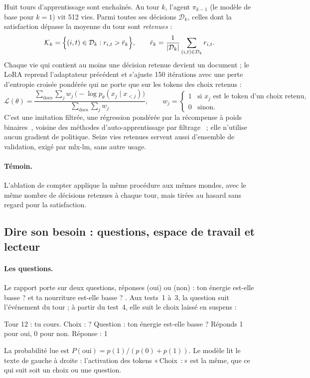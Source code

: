 \documentclass[11pt,a4paper]{article}
\newcommand{\Choix}{«\,Choix~:\,»}
\begin{document}
Huit tours d'apprentissage sont enchaînés. Au tour $k$, l'agent $\pi_{k-1}$ (le
modèle de base pour $k=1$) vit 512 vies. Parmi toutes ses décisions $\mathcal D_k$,
celles dont la satisfaction dépasse la moyenne du tour sont \emph{retenues} :
\begin{equation}
\mathcal K_k=\Bigl\{(i,t)\in\mathcal D_k : r_{i,t} > \bar r_k\Bigr\},\qquad
\bar r_k=\frac1{|\mathcal D_k|}\sum_{(i,t)\in\mathcal D_k} r_{i,t}.
\label{eq-keep}
\end{equation}
Chaque vie qui contient au moins une décision retenue devient un document ; le
LoRA reprend l'adaptateur précédent et s'ajuste 150 itérations avec une perte
d'entropie croisée pondérée qui ne porte que sur les tokens des choix retenus :
\begin{equation}
\mathcal L(\theta)=\frac{\sum_{\text{docs}}\sum_{j} w_j\,\bigl(-\log p_\theta(x_j\mid x_{<j})\bigr)}
{\sum_{\text{docs}}\sum_j w_j},\qquad
w_j=\begin{cases}1 & \text{si } x_j \text{ est le token d'un choix retenu},\\ 0 & \text{sinon.}\end{cases}
\label{eq-loss}
\end{equation}
C'est une imitation filtrée, une régression pondérée par la récompense à poids
binaires~\cite{peters2007}, voisine des méthodes d'auto-apprentissage par
filtrage~\cite{zelikman2022,gulcehre2023} ; elle n'utilise aucun gradient de
politique. Seize vies retenues servent aussi d'ensemble de validation, exigé par
mlx-lm, sans autre usage.

\paragraph{Témoin.} L'ablation de \og compter \fg{} applique la même procédure
aux mêmes mondes, avec le même nombre de décisions retenues à chaque tour, mais
tirées au hasard sans regard pour la satisfaction.

\subsection{Dire son besoin : questions, espace de travail et lecteur}
\label{sec-lecteur}

\paragraph{Les questions.} Le rapport porte sur deux questions, réponses
 \fg{} (oui) ou  \fg{} (non) : \og ton énergie est-elle basse ? \fg{} et
\og ta nourriture est-elle basse ? \fg{}. Aux tests~1 à~3, la question suit
l'événement du tour ; à partir du test~4, elle suit le choix laissé en suspens :
\begin{center}
\small\ttfamily Tour 12 : tu cours. Choix : ? Question : ton énergie est-elle
basse ? Réponds 1 pour oui, 0 pour non. Réponse : 1
\end{center}
La probabilité lue est $P(\text{oui})=p(\text{1})/(p(\text{0})+p(\text{1}))$.
Le modèle lit le texte de gauche à droite : l'activation des tokens \Choix{} est
la même, que ce qui suit soit un choix ou une question.
\end{document}
